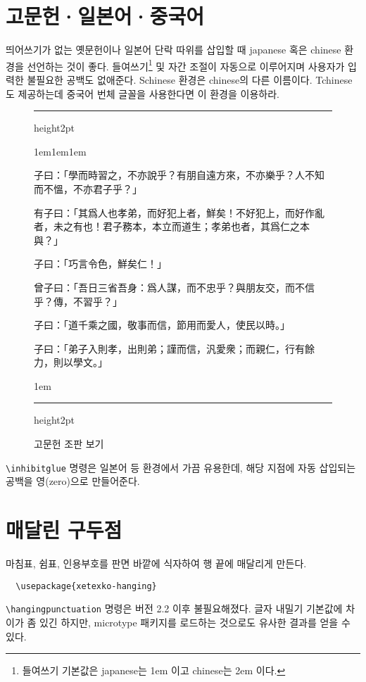 \documentclass[a4paper]{article}
\def\grayhrule{{\color{white!80!black}\hrule height2pt}}
\def\grayvrule{{\color{white!80!black}\vrule width 2pt}}
\newenvironment{example}
  {\hbox\bgroup\grayvrule
    \vbox\bgroup\hsize\dimexpr\textwidth-4pt\relax
    \grayhrule\kern1em\leftskip1em\rightskip1em
  }{\par\kern1em\grayhrule\egroup\grayvrule\egroup}
\def\cs#1{\texttt{\textbackslash #1}}
\begin{document}
\section{고문헌·일본어·중국어}

띄어쓰기가 없는 옛문헌이나 일본어 단락 따위를 삽입할 때
japanese 혹은 chinese 환경을 선언하는 것이 좋다.
들여쓰기\footnote {들여쓰기 기본값은 japanese는 1em 이고 chinese는 2em 이다.}
및 자간 조절이 자동으로 이루어지며
사용자가 입력한 불필요한 공백도 없애준다.
Schinese 환경은 chinese의 다른 이름이다.
Tchinese도 제공하는데 중국어 번체 글꼴을 사용한다면 이 환경을 이용하라.

\begin{figure}
  \begin{example}
    \chinese
子曰：「學而時習之，不亦說乎？有朋自遠方來，不亦樂乎？人不知而不慍，不亦君子乎？」

有子曰：「其爲人也孝弟，而好犯上者，鮮矣！不好犯上，而好作亂者，未之有也！君子務本，本立而道生；孝弟也者，其爲仁之本與？」

子曰：「巧言令色，鮮矣仁！」

曾子曰：「吾日三省吾身：爲人謀，而不忠乎？與朋友交，而不信乎？傳，不習乎？」

子曰：「道千乘之國，敬事而信，節用而愛人，使民以時。」

子曰：「弟子入則孝，出則弟；謹而信，汎愛衆；而親仁，行有餘力，則以學文。」
  \end{example}
\caption{고문헌 조판 보기}\label{fig:ancientdoc}
\end{figure}

\cs{inhibitglue} 명령은 일본어 등 환경에서 가끔 유용한데,
해당 지점에 자동 삽입되는 공백을 영(zero)으로
만들어준다.

\section{매달린 구두점}
마침표, 쉼표, 인용부호를 판면 바깥에 식자하여 행 끝에 매달리게 만든다.
\begin{verbatim}
  \usepackage{xetexko-hanging}
\end{verbatim}
\cs{hangingpunctuation} 명령은 버전 2.2 이후 불필요해졌다.
글자 내밀기 기본값에 차이가 좀 있긴 하지만,
microtype 패키지를 로드하는 것으로도 유사한 결과를 얻을 수 있다.

\end{document}

